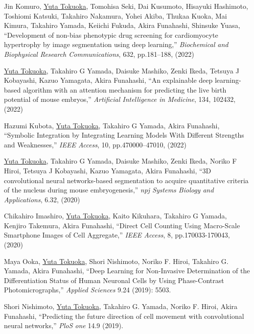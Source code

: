 \documentclass[letterpaper]{article}
\renewenvironment{itemize}{
  \begin{list}{}{
    \setlength{\leftmargin}{1.5em}
  }
}{
  \end{list}
}
\begin{document}
\begin{itemize}
 \item Jin Komuro, \underline{Yuta Tokuoka}, Tomohisa Seki, Dai
       Kusumoto, Hisayuki Hashimoto, Toshiomi Katsuki, Takahiro
       Nakamura, Yohei Akiba, Thukaa Kuoka, Mai Kimura, Takahiro Yamada,
       Keiichi Fukuda, Akira Funahashi, Shinsuke Yuasa, ``Development of
       non-bias phenotypic drug screening for cardiomyocyte hypertrophy
       by image segmentation using deep learning,'' {\itshape
       Biochemical and Biophysical Research Communications}, 632,
       pp.181--188, (2022)

 \item \underline{Yuta Tokuoka}, Takahiro G Yamada, Daisuke Mashiko,
       Zenki Ikeda, Tetsuya J Kobayashi, Kazuo Yamagata, Akira
       Funahashi, ``An explainable deep learning-based algorithm with an
       attention mechanism for predicting the live birth potential of
       mouse embryos,'' {\itshape Artificial Intelligence in Medicine},
       134, 102432, (2022)

 \item Hazumi Kubota, \underline{Yuta Tokuoka}, Takahiro G Yamada, Akira
       Funahashi, ``Symbolic Integration by Integrating Learning Models
       With Different Strengths and Weaknesses,'' {\itshape IEEE
       Access}, 10, pp.470000--47010, (2022)

 \item \underline{Yuta Tokuoka}, Takahiro G Yamada, Daisuke Mashiko,
       Zenki Ikeda, Noriko F Hiroi, Tetsuya J Kobayashi, Kazuo Yamagata,
       Akira Funahashi, ``3D convolutional neural networks-based
       segmentation to acquire quantitative criteria of the nucleus
       during mouse embryogenesis,'' {\itshape npj Systems Biology and
       Applications}, 6.32, (2020)

 \item Chikahiro Imashiro, \underline{Yuta Tokuoka}, Kaito Kikuhara,
       Takahiro G Yamada, Kenjiro Takemura, Akira Funahashi, ``Direct
       Cell Counting Using Macro-Scale Smartphone Images of Cell
       Aggregate,'' {\itshape IEEE Access}, 8, pp.170033-170043, (2020)

 \item Maya Ooka, \underline{Yuta Tokuoka}, Shori Nishimoto, Noriko
       F. Hiroi, Takahiro G. Yamada, Akira Funahashi, ``Deep Learning
       for Non-Invasive Determination of the Differentiation Status of
       Human Neuronal Cells by Using Phase-Contrast Photomicrographs,''
       {\itshape Applied Sciences} 9.24 (2019): 5503.

 \item Shori Nishimoto, \underline{Yuta Tokuoka}, Takahiro G. Yamada,
       Noriko F. Hiroi, Akira Funahashi, ``Predicting the future
       direction of cell movement with convolutional neural networks,''
       {\itshape PloS one} 14.9 (2019).
\end{itemize}
\end{document}
